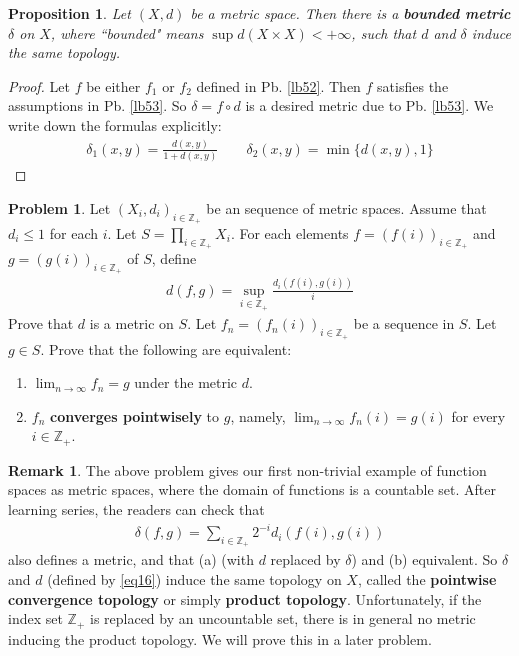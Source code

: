 \documentclass[12pt,b5paper,notitlepage]{article}
\theoremstyle{definition}
\newtheorem{rem}[df]{Remark}
\newtheorem{prob}{Problem}[section]
\theoremstyle{plain}
\newtheorem{pp}[df]{Proposition}
\newcommand{\Zbb}{\mathbb Z}
\newcommand{\dps}{\displaystyle}
\numberwithin{equation}{section}
\begin{document}
\begin{pp}
Let $(X,d)$ be a metric space. Then there is a \textbf{bounded metric}  $\delta$ on $X$, where ``bounded" means $\sup d(X\times X)<+\infty$, such that $d$ and $\delta$ induce the same topology.
\end{pp}
\begin{proof}
Let $f$ be either $f_1$ or $f_2$ defined in Pb. \ref{lb52}. Then $f$ satisfies the assumptions in Pb. \ref{lb53}. So $\delta=f\circ d$ is a desired metric due to Pb. \ref{lb53}. We write down the formulas explicitly:
\begin{align*}
\delta_1(x,y)=\frac{d(x,y)}{1+d(x,y)}\qquad \delta_2(x,y)=\min\{d(x,y),1\}
\end{align*}
\end{proof}

\begin{prob}\label{lb78}
Let $(X_i,d_i)_{i\in\Zbb_+}$ be an sequence of metric spaces. Assume that $d_i\leq 1$ for each $i$. Let $\dps S=\prod_{i\in\Zbb_+} X_i$. For each elements $f=(f(i))_{i\in\Zbb_+}$ and $g=(g(i))_{i\in\Zbb_+}$ of $S$, define
\begin{align}
d(f,g)=\sup_{i\in\Zbb_+} \frac {d_i(f(i),g(i))}{i}  \label{eq16}
\end{align} 
Prove that $d$ is a metric on $S$. Let $f_n=(f_n(i))_{i\in\Zbb_+}$ be a sequence in $S$. Let $g\in S$. Prove that the following are equivalent:
\begin{enumerate}[label=(\alph*)]
\item $\dps \lim_{n\rightarrow\infty} f_n=g$ under the metric $d$.
\item $f_n$ \textbf{converges pointwisely} to $g$, namely, $\dps\lim_{n\rightarrow\infty} f_n(i)=g(i)$ for every $i\in\Zbb_+$.
\end{enumerate}
\end{prob}

\begin{rem}
The above problem gives our first non-trivial example of function spaces  as metric spaces, where the domain of functions is a countable set. After learning series, the readers can check that 
\begin{align*}
\delta(f,g)=\sum_{i\in\Zbb_+}2^{-i} d_i(f(i),g(i))
\end{align*}
also defines a metric, and that (a) (with $d$ replaced by $\delta$) and (b) equivalent. So $\delta$ and $d$ (defined by \eqref{eq16}) induce the same topology on $X$, called the \textbf{pointwise convergence topology} or simply \textbf{product topology}. Unfortunately, if the index set $\Zbb_+$ is replaced by an uncountable set, there is in general no metric inducing the product topology. We will prove this in a later problem.
\end{rem}
\end{document}
